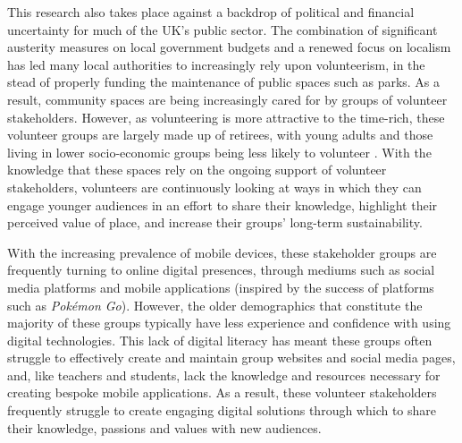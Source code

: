 This research also takes place against a backdrop of political and financial uncertainty for much of the UK's public sector. The combination of significant austerity measures on local government budgets and a renewed focus on localism has led many local authorities to increasingly rely upon volunteerism, in the stead of properly funding the maintenance of public spaces such as parks. As a result, community spaces are being increasingly cared for by groups of volunteer stakeholders. However, as volunteering is more attractive to the time-rich, these volunteer groups are largely made up of retirees, with young adults and those living in lower socio-economic groups being less likely to volunteer \citep{ncvo2019}. With the knowledge that these spaces rely on the ongoing support of volunteer stakeholders, volunteers are continuously looking at ways in which they can engage younger audiences in an effort to share their knowledge, highlight their perceived value of place, and increase their groups' long-term sustainability. 

With the increasing prevalence of mobile devices, these stakeholder groups are frequently turning to online digital presences, through mediums such as social media platforms and mobile applications (inspired by the success of platforms such as \textit{Pok\'emon Go}). However, the older demographics that constitute the majority of these groups typically have less experience and confidence with using digital technologies. This lack of digital literacy has meant these groups often struggle to effectively create and maintain group websites and social media pages, and, like teachers and students, lack the knowledge and resources necessary for creating bespoke mobile applications. As a result, these volunteer stakeholders frequently struggle to create engaging digital solutions through which to share their knowledge, passions and values with new audiences.

